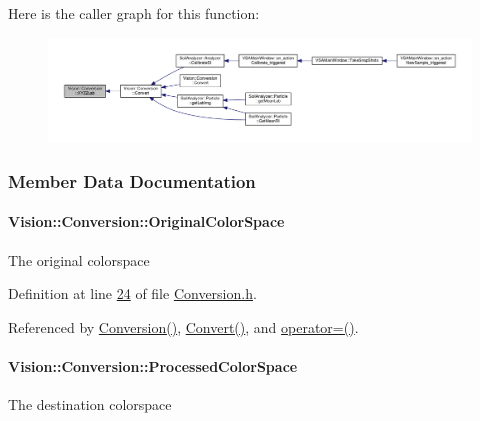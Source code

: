 Here is the caller graph for this function\+:
\nopagebreak
\begin{figure}[H]
\begin{center}
\leavevmode
\includegraphics[width=350pt]{class_vision_1_1_conversion_a9ecc41c4226eafc55d0ee0cc550e593b_icgraph}
\end{center}
\end{figure}




\subsubsection{Member Data Documentation}
\hypertarget{class_vision_1_1_conversion_a3fd4bac8a8d6788b6a1886916c5464b4}{}
\paragraph[{Original\+Color\+Space}]{ Vision\+::\+Conversion\+::\+Original\+Color\+Space}\label{class_vision_1_1_conversion_a3fd4bac8a8d6788b6a1886916c5464b4}
The original colorspace 

Definition at line \hyperlink{_conversion_8h_source_l00024}{24} of file \hyperlink{_conversion_8h_source}{Conversion.\+h}.



Referenced by \hyperlink{_conversion_8cpp_source_l00014}{Conversion()}, \hyperlink{_conversion_8cpp_source_l00086}{Convert()}, and \hyperlink{_conversion_8cpp_source_l00041}{operator=()}.

\hypertarget{class_vision_1_1_conversion_a57337750cb60b9ff7ed269c184d1fda7}{}
\paragraph[{Processed\+Color\+Space}]{ Vision\+::\+Conversion\+::\+Processed\+Color\+Space}\label{class_vision_1_1_conversion_a57337750cb60b9ff7ed269c184d1fda7}
The destination colorspace 

